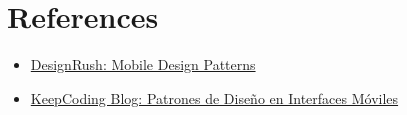 \documentclass{article}
\begin{document}
\section{References}
\begin{itemize}
    \item \href{https://www.designrush.com/best-designs/apps/trends/mobile-design-patterns}{DesignRush: Mobile Design Patterns}
    \item \href{https://keepcoding.io/blog/patrones-de-diseno-en-interfaces-moviles/}{KeepCoding Blog: Patrones de Diseño en Interfaces Móviles}
\end{itemize}
\end{document}
